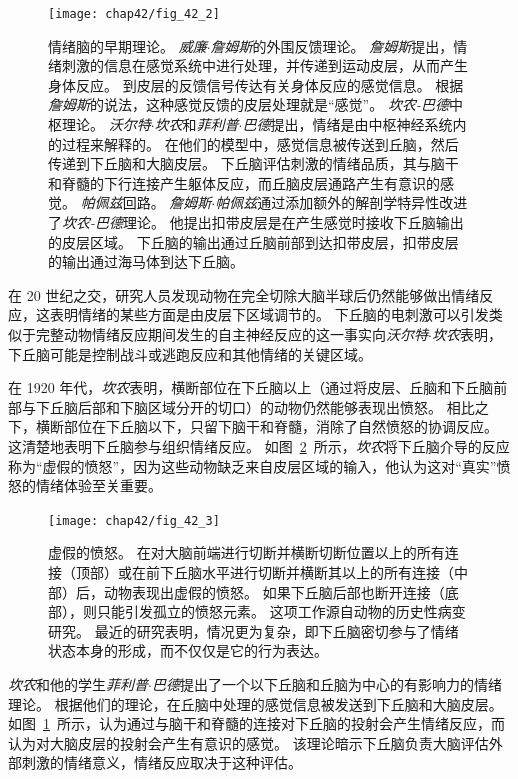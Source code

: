 \begin{figure}[htbp]
	\centering
	\texttt{[image: chap42/fig\_42\_2]}
	\caption{情绪脑的早期理论\cite{ledoux1997emotional}。
		\textit{威廉$\cdot$詹姆斯}的外围反馈理论。
		\textit{詹姆斯}提出，情绪刺激的信息在感觉系统中进行处理，并传递到运动皮层，从而产生身体反应。
		到皮层的反馈信号传达有关身体反应的感觉信息。
		根据\textit{詹姆斯}的说法，这种感觉反馈的皮层处理就是“感觉”。
		\textit{坎农-巴德}中枢理论。
		\textit{沃尔特$\cdot$坎农}和\textit{菲利普$\cdot$巴德}提出，情绪是由中枢神经系统内的过程来解释的。
		在他们的模型中，感觉信息被传送到丘脑，然后传递到下丘脑和大脑皮层。
		下丘脑评估刺激的情绪品质，其与脑干和脊髓的下行连接产生躯体反应，而丘脑皮层通路产生有意识的感觉。
		\textit{帕佩兹}回路。
		\textit{詹姆斯$\cdot$帕佩兹}通过添加额外的解剖学特异性改进了\textit{坎农-巴德}理论。
		他提出扣带皮层是在产生感觉时接收下丘脑输出的皮层区域。
		下丘脑的输出通过丘脑前部到达扣带皮层，扣带皮层的输出通过海马体到达下丘脑。}
	\label{fig:42_2}
\end{figure}


在 20 世纪之交，研究人员发现动物在完全切除大脑半球后仍然能够做出情绪反应，这表明情绪的某些方面是由皮层下区域调节的。
下丘脑的电刺激可以引发类似于完整动物情绪反应期间发生的自主神经反应的这一事实向\textit{沃尔特$\cdot$坎农}表明，下丘脑可能是控制战斗或逃跑反应和其他情绪的关键区域。


在 1920 年代，\textit{坎农}表明，横断部位在下丘脑以上（通过将皮层、丘脑和下丘脑前部与下丘脑后部和下脑区域分开的切口）的动物仍然能够表现出愤怒。
相比之下，横断部位在下丘脑以下，只留下脑干和脊髓，消除了自然愤怒的协调反应。
这清楚地表明下丘脑参与组织情绪反应。
如图~\ref{fig:42_3}~所示，\textit{坎农}将下丘脑介导的反应称为“虚假的愤怒”，因为这些动物缺乏来自皮层区域的输入，他认为这对“真实”愤怒的情绪体验至关重要。


\begin{figure}[htbp]
	\centering
	\texttt{[image: chap42/fig\_42\_3]}
	\caption{虚假的愤怒。
		在对大脑前端进行切断并横断切断位置以上的所有连接（顶部）或在前下丘脑水平进行切断并横断其以上的所有连接（中部）后，动物表现出虚假的愤怒。
		如果下丘脑后部也断开连接（底部），则只能引发孤立的愤怒元素。
		这项工作源自动物的历史性病变研究。
		最近的研究表明，情况更为复杂，即下丘脑密切参与了情绪状态本身的形成，而不仅仅是它的行为表达。}
	\label{fig:42_3}
\end{figure}


\textit{坎农}和他的学生\textit{菲利普$\cdot$巴德}提出了一个以下丘脑和丘脑为中心的有影响力的情绪理论。
根据他们的理论，在丘脑中处理的感觉信息被发送到下丘脑和大脑皮层。
如图~\ref{fig:42_2}~所示，认为通过与脑干和脊髓的连接对下丘脑的投射会产生情绪反应，而认为对大脑皮层的投射会产生有意识的感觉。
该理论暗示下丘脑负责大脑评估外部刺激的情绪意义，情绪反应取决于这种评估。


